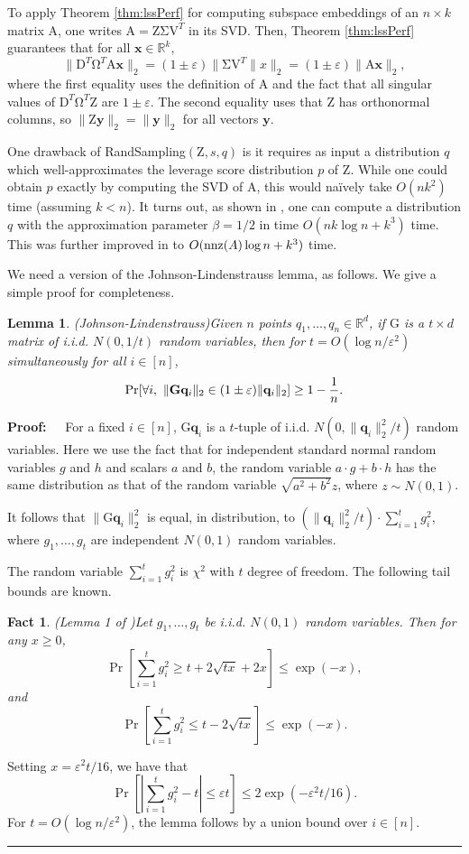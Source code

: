 \documentclass[11pt]{article}
\newtheorem{lemma}[theorem]{Lemma}
\newenvironment{proof}{\begin{trivlist} \item {\bf Proof:~~}}
  {\qed\end{trivlist}}
\newcommand{\mat}[1]{{\ensuremath{\bm{\mathrm{#1}}}}}
\def\q{{\mathbf q}}
\def\matA{\mat{A}}
\def\matD{\mat{D}}
\def\matG{\mat{G}}
\def\matV{\mat{V}}
\def\matZ{\mat{Z}}
\def\nnz{{ \rm nnz }}
\def\frac#1#2{{#1\over #2}}
\def\qed{\hfill\rule{2mm}{2mm}}
\def\x{{\mathbf x}}
\def\y{{\mathbf y}}
\newcommand{\eps}{\varepsilon}
\newtheorem{fact}{Fact}
\begin{document}
To apply Theorem \ref{thm:lssPerf} for computing subspace embeddings of an $n \times k$ matrix $\matA$, one writes
$\matA = \matZ \mat\Sigma \matV^T$ in its SVD. Then, Theorem \ref{thm:lssPerf} guarantees that for all $\x \in \mathbb{R}^k$,
$$\|\matD^T \mat\Omega^T \matA \x\|_2 = (1 \pm \eps)\|\mat\Sigma\matV^T\|x\|_2 = (1 \pm \eps)\|\matA\x\|_2,$$
where the first equality uses the definition of $\matA$ and the fact that all singular values of $\matD^T\mat\Omega^T\matZ$
are $1 \pm \eps$. The second equality uses that $\matZ$ has orthonormal columns, so $\|\matZ\y\|_2 = \|\y\|_2$ for all
vectors $\y$. 

One drawback of {\textsc RandSampling}$(\matZ, s, q)$ is it requires as 
input a distribution $q$ which well-approximates the leverage
score distribution $p$ of $\matZ$. While one could obtain $p$ exactly by computing the SVD of $\matA$, this would na\"ively take
$O(nk^2)$ time (assuming $k < n$). It turns out, as shown in \cite{DMMW12}, one can compute a distribution $q$ with the approximation
parameter $\beta = 1/2$ in time $O(nk\log n + k^3)$ time. This was further improved in \cite{CW13} to $O(\nnz(A)\log n + k^3)$ time. 

We need a version of the Johnson-Lindenstrauss lemma, as follows. We give a simple proof for completeness.
\begin{lemma}(Johnson-Lindenstrauss)\label{lem:jl}
Given $n$ points $q_1, \ldots, q_n \in \mathbb{R}^d$, if $\matG$ is a $t \times d$ matrix of i.i.d. $N(0,1/t)$ random 
variables, then for $t = O(\log n / \eps^2)$ simultaneously for all $i \in [n]$,
$$\Pr[\forall i, \ \|\matG \q_i\|_2 \in (1 \pm \eps)\|\q_i\|_2] \geq 1-\frac{1}{n}.$$
\end{lemma}
\begin{proof}
For a fixed $i \in [n]$, $\matG \q_i$ is a $t$-tuple of i.i.d. $N(0, \|\q_i\|_2^2/t)$ random variables. Here we use
the fact that for independent standard normal random variables $g$ and $h$ and scalars $a$ and $b$, 
the random variable $a \cdot g + b \cdot h$ has the same distribution as that of the random variable 
$\sqrt{a^2+b^2} z$, where $z \sim N(0,1)$. 

It follows that $\|\matG \q_i\|_2^2$  
is equal, in distribution, to $(\|\q_i\|_2^2/t) \cdot \sum_{i=1}^t g_i^2$, where $g_1, \ldots, g_t$ are independent $N(0,1)$
random variables. 

The random variable $\sum_{i=1}^t g_i^2$ is $\chi^2$ with $t$ degree of freedom. The following tail bounds are known.
\begin{fact}(Lemma 1 of \cite{lm00})\label{fact:c2}
Let $g_1, \ldots, g_t$ be i.i.d. $N(0,1)$ random variables. Then for any $x \geq 0$,
$$\Pr[\sum_{i=1}^t g_i^2 \geq t + 2\sqrt{tx} + 2x] \leq \exp(-x),$$
and
$$\Pr[\sum_{i=1}^t g_i^2 \leq t - 2\sqrt{tx}] \leq \exp(-x).$$
\end{fact}
Setting $x = \eps^2 t/16$, we have that
$$\Pr[|\sum_{i=1}^t g_i^2 - t| \leq \eps t] \leq 2\exp(-\eps^2 t/16).$$
For $t = O(\log n / \eps^2)$, the lemma follows by a union bound over $i \in [n]$.
\end{proof}
\end{document}
